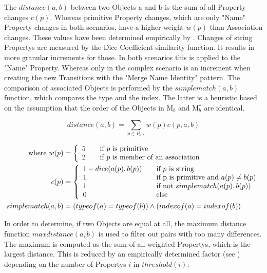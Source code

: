 The $distance(a,b)$ between two \glspl{Object} a and b is the sum of all \gls{Property} changes $c(p)$. Whereas primitive \gls{Property} changes, which are only "Name" \gls{Property} changes in both scenarios, have a higher weight $w(p)$ than \gls{Association} changes. These values have been determined empirically by \cite{EclipseFoundation2014c}. Changes of string \glspl{Property} are measured by the Dice Coefficient \cite{Jaccard1912} similarity function. It results in more granular increments for those. In both scenarios this is applied to the "Name" \gls{Property}. Whereas only in the complex scenario is an increment when creating the new Transitions with the "Merge Name Identity" pattern. The comparison of associated \glspl{Object} is performed by the $simplematch(a,b)$ function, which compares the type and the index. The latter is a heuristic based on the assumption that the order of the \glspl{Object} in M$_b$ and M$_b^*$ are identical.


$$distance(a,b) = \sum_{p \in P_{a,b}} w(p) c(p,a,b) $$

\begin{align*}
  \text{where}~
	w(p) &= \left\{
				\begin{array}{l l}
					5 & \quad \text{if $p$ is primitive}\\
					2 & \quad \text{if $p$ is member of an association}
				\end{array}\right.\\		   
	c(p) &= \left\{
				\begin{array}{l l}	
					1 - dice(a(p),b(p)) & \quad \text{if $p$ is string}\\				
					1 & \quad \text{if p is primitive and $a(p) \neq b(p)$}\\
					1 & \quad \text{if not $simplematch(a(p),b(p))$ }\\			
					0 & \quad \text{else}
				\end{array}\right.\\
	simplematch(a,b) &= (typeof(a) = typeof(b)) \land (indexof(a) = indexof(b))
\end{align*}

In order to determine, if two \glspl{Object} are equal at all, the maximum distance function $maxdistance(a,b)$ is used to filter out pairs with too many differences. The maximum is computed as the sum of all weighted \glspl{Property}, which is the largest distance. This is reduced by an empirically determined factor (see \cite{EclipseFoundation2014c}) depending on the number of \glspl{Property} $i$ in $threshold(i)$:

